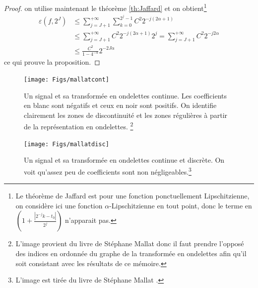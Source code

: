 \begin{proof}
	on utilise maintenant le théorème \ref{th:Jaffard} et on obtient\footnote{Le théorème de Jaffard est pour une fonction ponctuellement Lipschitzienne, on considère ici une fonction $\alpha$-Lipschitzienne en tout point, donc le terme en $(1 + \frac{|2^{-j}k -t_0|}{2^j})$ n'apparait pas.}
	\begin{align*}
		\varepsilon(f, 2^J) &\leq \sum_{j=J+1}^{+\infty} \sum_{k=0}^{2^j -1} C^2 2^{-j(2\alpha + 1)} \\
		&\leq \sum_{j=J+1}^{+\infty} C^2 2^{-j(2\alpha + 1)} 2^{j} = \sum_{j=J+1}^{+\infty} C^2 2^{-j2\alpha} \\
		&\leq \frac{C^2}{1 - 4^{-\alpha}} 2^{-2J\alpha}	
	\end{align*}
	ce qui prouve la proposition.
\end{proof}


\begin{figure}[h]
	\texttt{[image: Figs/mallatcont]}
	\caption{Un signal et sa transformée en ondelettes continue. Les coefficients en blanc sont négatifs et ceux en noir sont positifs. On identifie clairement les zones de discontinuité et les zones régulières à partir de la représentation en ondelettes. \footnote{L'image provient du livre de Stéphane Mallat \cite{mallatbook} donc il faut prendre l'opposé des indices en ordonnée du graphe de la transformée en ondelettes afin qu'il soit consistant avec les résultats de ce mémoire.}\label{fig:deccont}} 
\end{figure}
\begin{figure}[h]
	\texttt{[image: Figs/mallatdisc]}
	\caption{Un signal et sa transformée en ondelettes continue et discrète. On voit qu'assez peu de coefficients sont non négligeables.\footnote{L'image est tirée du livre de Stéphane Mallat \cite{mallatbook}.}\label{fig:decdisc}} 
\end{figure}
